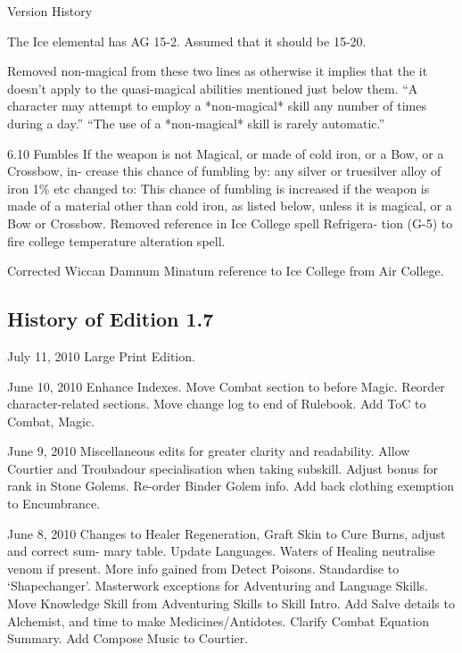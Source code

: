 \begin{Chapter}{Version History}
\begin{Description}
The Ice elemental has AG 15-2.  Assumed that it should be 15-20.

Removed non-magical from these two lines as otherwise it implies that
the it doesn't apply to the quasi-magical abilities mentioned just
below them.  “A character may attempt to employ a *non-magical* skill
any number of times during a day.”  “The use of a *non-magical* skill
is rarely automatic.”

6.10 Fumbles If the weapon is not Magical, or made of cold iron, or a
Bow, or a Crossbow, in- crease this chance of fumbling by: any silver
or truesilver alloy of iron 1\% etc changed to: This chance of
fumbling is increased if the weapon is made of a material other than
cold iron, as listed below, unless it is magical, or a Bow or
Crossbow.  Removed reference in Ice College spell Refrigera- tion
(G-5) to fire college temperature alteration spell.

Corrected Wiccan Damnum Minatum reference to Ice College from Air
College.
\end{Description}

\subsection{History of Edition 1.7}

\begin{Description}

\item[July 11, 2010] Large Print Edition. 

\item[June 10, 2010] Enhance Indexes.  Move Combat section to before
  Magic.  Reorder character-related sections.  Move change log to end
  of Rulebook.  Add ToC to Combat, Magic.

\item[June 9, 2010] Miscellaneous edits for greater clarity and
  readability.  Allow Courtier and Troubadour specialisation when
  taking subskill.  Adjust bonus for rank in Stone Golems. Re-order
  Binder Golem info.  Add back clothing exemption to Encumbrance.

\item[June 8, 2010] Changes to Healer Regeneration, Graft Skin to Cure
  Burns, adjust and correct sum- mary table.  Update Languages.
  Waters of Healing neutralise venom if present. More info gained from
  Detect Poisons.  Standardise to ‘Shapechanger’.  Masterwork
  exceptions for Adventuring and Language Skills. Move Knowledge Skill
  from Adventuring Skills to Skill Intro.  Add Salve details to
  Alchemist, and time to make Medicines/Antidotes.  Clarify Combat
  Equation Summary.  Add Compose Music to Courtier.


\end{Description}
\end{Chapter}
